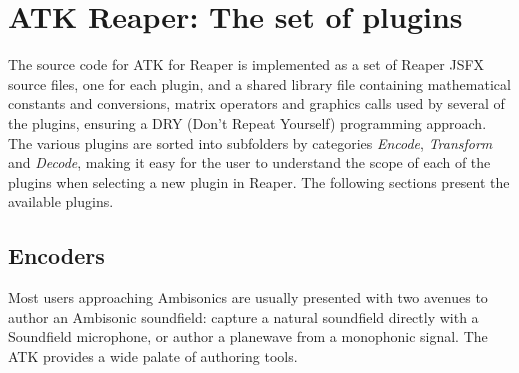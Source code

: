 \documentclass{article}
\begin{document}
\section{ATK Reaper: The set of plugins}\label{sec:implementation}

The source code for ATK for Reaper is implemented as a set of Reaper JSFX source files, one for each plugin, and a shared library file containing mathematical constants and conversions, matrix operators and graphics calls used by several of the plugins, ensuring a DRY (Don't Repeat Yourself) programming approach.
The various plugins are sorted into subfolders by categories \emph{Encode}, \emph{Transform} and \emph{Decode}, making it easy for the user to understand the scope of each of the plugins when selecting a new plugin in Rea\-per. 
The following sections present the available plugins.


\subsection{Encoders}\label{sec:encoders}

Most users approaching Ambisonics are usually presented with two avenues to author an Ambisonic soundfield: capture a natural soundfield directly with a Soundfield microphone, or author a planewave from a monophonic signal.
The ATK provides a wide palate of authoring tools.
\end{document}
